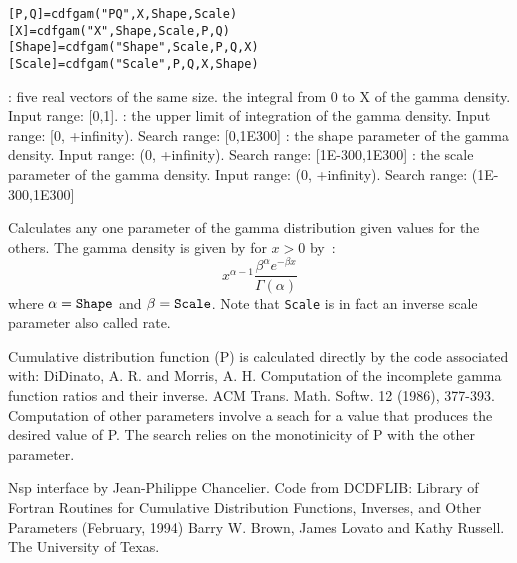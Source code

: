 \begin{mandesc}
\end{mandesc}
\label{cdfgam}
\begin{calling_sequence}
\begin{verbatim}
[P,Q]=cdfgam("PQ",X,Shape,Scale)  
[X]=cdfgam("X",Shape,Scale,P,Q)  
[Shape]=cdfgam("Shape",Scale,P,Q,X)  
[Scale]=cdfgam("Scale",P,Q,X,Shape)  
\end{verbatim}
\end{calling_sequence}
\begin{parameters}
  \begin{varlist}
    : five real vectors of the same size.
     the integral from 0 to X of the gamma density. Input range: [0,1].
    :  the upper limit of integration of the gamma density. Input range: [0, +infinity). Search range: [0,1E300]
      :  the shape parameter of the gamma density. Input range: (0, +infinity). Search range: [1E-300,1E300]
      :  the scale parameter of the gamma density. Input range: (0, +infinity). Search range: (1E-300,1E300]
  \end{varlist}
\end{parameters}
\begin{mandescription}
  Calculates any one parameter of the gamma distribution given values for the others.
  The gamma density is given by for $x>0$ by~:
  \begin{equation}
    x^{\alpha-1} \frac{ \beta^\alpha  e^{- \beta x}}{\Gamma(\alpha)}
  \end{equation}
  where $\alpha = \mbox{\tt Shape}$ and $\beta = \mbox{\tt Scale}$. 
  Note that \verb!Scale! is in fact an inverse scale parameter also 
  called rate. 

  Cumulative distribution function (P) is calculated directly by
  the code associated with: DiDinato, A. R. and Morris, A. H. 
  Computation of the  incomplete
  gamma function  ratios  and their  inverse.   ACM  Trans.  Math.
  Softw. 12 (1986), 377-393.
  Computation of other parameters involve a seach for a value that
  produces  the desired  value  of P.   The search relies  on  the
  monotinicity of P with the other parameter.
\end{mandescription}

\begin{program}
\end{program}

\begin{authors}
  Nsp interface by Jean-Philippe Chancelier. Code from DCDFLIB: 
  Library of Fortran Routines for Cumulative Distribution
  Functions, Inverses, and Other Parameters (February, 1994)
  Barry W. Brown, James Lovato and Kathy Russell. The University of Texas.
\end{authors}
